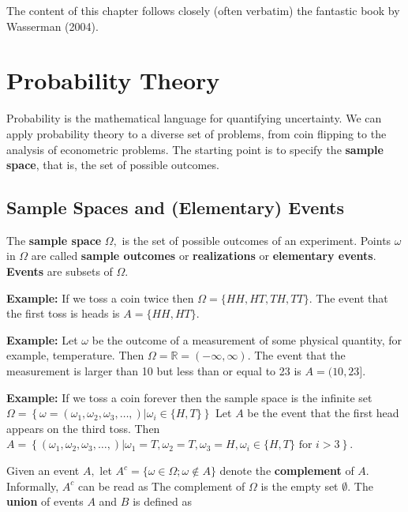 \documentclass[
  letterpaper,
  DIV=11,
  numbers=noendperiod]{scrreprt}
\theoremstyle{definition}
\theoremstyle{plain}
\theoremstyle{plain}
\theoremstyle{remark}
\begin{document}
The content of this chapter follows closely (often verbatim) the
fantastic book by Wasserman (2004).

\hypertarget{probability-theory}{%
\section{Probability Theory}\label{probability-theory}}

Probability is the mathematical language for quantifying uncertainty. We
can apply probability theory to a diverse set of problems, from coin
flipping to the analysis of econometric problems. The starting point is
to specify the \textbf{sample space}, that is, the set of possible
outcomes.

\hypertarget{sample-spaces-and-elementary-events}{%
\subsection{Sample Spaces and (Elementary)
Events}\label{sample-spaces-and-elementary-events}}

The \textbf{sample space} \(\Omega,\) is the set of possible outcomes of
an experiment. Points \(\omega\) in \(\Omega\) are called \textbf{sample
outcomes} or \textbf{realizations} or \textbf{elementary events}.
\textbf{Events} are subsets of \(\Omega\).

\bigskip

\textbf{Example:} If we toss a coin twice then
\(\Omega=\{H H, H T, T H, T T\} .\) The event that the first toss is
heads is \(A=\{H H, H T\}\).

\bigskip

\textbf{Example:} Let \(\omega\) be the outcome of a measurement of some
physical quantity, for example, temperature. Then
\(\Omega=\mathbb{R}=(-\infty, \infty).\) The event that the measurement
is larger than 10 but less than or equal to 23 is \(A=(10,23]\).

\bigskip

\textbf{Example:} If we toss a coin forever then the sample space is the
infinite set
\(\Omega=\left\{\omega=\left(\omega_{1}, \omega_{2}, \omega_{3}, \ldots,\right)|\omega_{i} \in\{H, T\}\right\}\)
Let \(A\) be the event that the first head appears on the third toss.
Then
\(A=\left\{\left(\omega_{1}, \omega_{2}, \omega_{3}, \ldots,\right)| \omega_{1}=T, \omega_{2}=T, \omega_{3}=H, \omega_{i} \in\{H, T\} \text { for } i>3\right\}\).

\bigskip

Given an event \(A,\) let
\(A^{c}=\{\omega \in \Omega ; \omega \notin A\}\) denote the
\textbf{complement} of \(A\). Informally, \(A^{c}\) can be read as
 The complement of \(\Omega\) is the empty set
\(\emptyset\). The \textbf{union} of events \(A\) and \(B\) is defined
as
\end{document}
